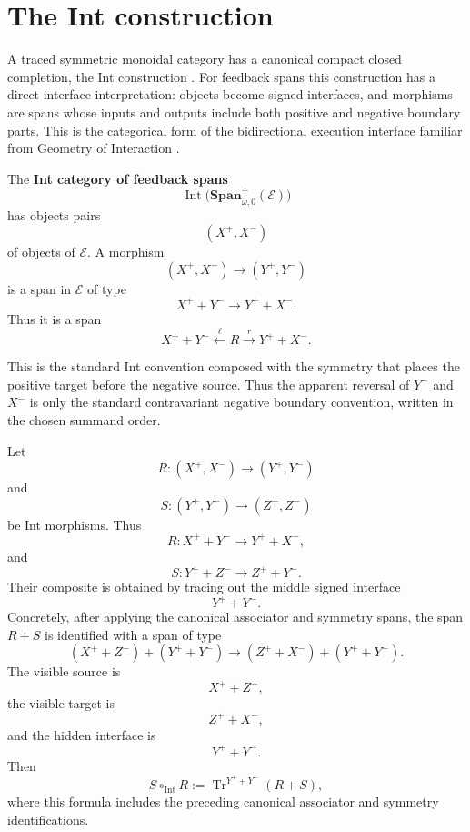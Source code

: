 \section{The Int construction}
\label{sec:int-construction-feedback}

A traced symmetric monoidal category has a canonical compact closed completion,
the Int construction
\cite{JoyalStreetVerity1996TracedMonoidalCategories}. For feedback spans this
construction has a direct interface interpretation: objects become signed
interfaces, and morphisms are spans whose inputs and outputs include both
positive and negative boundary parts. This is the categorical form of the
bidirectional execution interface familiar from Geometry of Interaction
\cite{Girard1989GeometryInteractionI,AbramskyHaghverdiScott2002GeometryInteractionLCA}.

\begin{definition}
\label{def:int-feedback-spans}
The \textbf{Int category of feedback spans}
\[
  \operatorname{Int}
  \bigl(
    \mathbf{Span}^{+}_{\omega,0}(\mathcal E)
  \bigr)
\]
has objects pairs
\[
  (X^+,X^-)
\]
of objects of \(\mathcal E\). A morphism
\[
  (X^+,X^-)\longrightarrow(Y^+,Y^-)
\]
is a span in \(\mathcal E\) of type
\[
  X^+ + Y^-
  \longrightarrow
  Y^+ + X^-.
\]
Thus it is a span
\[
  X^+ + Y^-
  \xleftarrow{\ell}
  R
  \xrightarrow{r}
  Y^+ + X^-.
\]
\end{definition}

This is the standard Int convention composed with the symmetry that places the
positive target before the negative source. Thus the apparent reversal of
\(Y^-\) and \(X^-\) is only the standard contravariant negative boundary
convention, written in the chosen summand order.

Let
\[
  R:(X^+,X^-)\to(Y^+,Y^-)
\]
and
\[
  S:(Y^+,Y^-)\to(Z^+,Z^-)
\]
be Int morphisms. Thus
\[
  R:X^+ + Y^-\to Y^+ + X^-,
\]
and
\[
  S:Y^+ + Z^-\to Z^+ + Y^-.
\]
Their composite is obtained by tracing out the middle signed interface
\[
  Y^+ + Y^-.
\]
Concretely, after applying the canonical associator and symmetry spans, the
span \(R+S\) is identified with a span of type
\[
  (X^+ + Z^-)+(Y^+ + Y^-)
  \longrightarrow
  (Z^+ + X^-)+(Y^+ + Y^-).
\]
The visible source is
\[
  X^+ + Z^-,
\]
the visible target is
\[
  Z^+ + X^-,
\]
and the hidden interface is
\[
  Y^+ + Y^-.
\]
Then
\[
  S\circ_{\operatorname{Int}}R
  :=
  \operatorname{Tr}^{Y^++Y^-}(R+S),
\]
where this formula includes the preceding canonical associator and symmetry
identifications.

